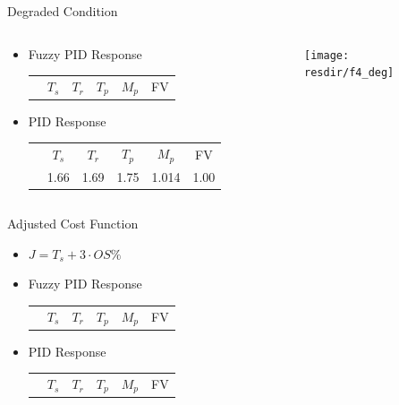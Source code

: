 \documentclass[]{beamer}
\newcommand{\resdir}{../results}
\begin{document}
\begin{frame}{Degraded Condition}
    \begin{columns}
        \begin{column}{0.5\textwidth}
            \vspace{-3.25cm}
            \begin{itemize}
                \item Fuzzy PID Response
                    \begin{tabular}{cccccc}
                        &$T_s$ & $T_r$ & $T_p$ & $M_p$ & FV\\\cline{2-6}
                        
                    \end{tabular}
                \item PID Response
                    \begin{tabular}{cccccc}
                        &$T_s$ & $T_r$ & $T_p$ & $M_p$ & FV\\\cline{2-6}
                        & 1.66      & 1.69      & 1.75      & 1.014       & 1.00
                    \end{tabular}
            \end{itemize}
        \end{column}
        \begin{column}{0.5\textwidth}
            \centering
            \vspace{3.25cm}
            \texttt{[image: \\resdir/f4\_deg]}
        \end{column}
    \end{columns}
\end{frame}

\begin{frame}{Adjusted Cost Function}
            \begin{itemize}
                \item $J = T_s + 3\cdot OS\%$
                \item Fuzzy PID Response
                    \begin{tabular}{cccccc}
                        &$T_s$ & $T_r$ & $T_p$ & $M_p$ & FV\\\cline{2-6}
                        
                    \end{tabular}
                \item PID Response
                    \begin{tabular}{cccccc}
                        &$T_s$ & $T_r$ & $T_p$ & $M_p$ & FV\\\cline{2-6}
                        
                    \end{tabular}
            \end{itemize}
\end{frame}
\end{document}
